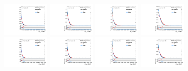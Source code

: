 \begin{figure}[htbp]
  \centering
  \includegraphics[width=0.21\textwidth]{fig/uncertainties/systs_res_e_HP_bb_LDy_MVVScale_ProjX.pdf}
  \includegraphics[width=0.21\textwidth]{fig/uncertainties/systs_res_e_LP_bb_LDy_MVVScale_ProjX.pdf}
  \includegraphics[width=0.21\textwidth]{fig/uncertainties/systs_res_e_HP_bb_HDy_MVVScale_ProjX.pdf}
  \includegraphics[width=0.21\textwidth]{fig/uncertainties/systs_res_e_LP_bb_HDy_MVVScale_ProjX.pdf}\\
  \includegraphics[width=0.21\textwidth]{fig/uncertainties/systs_res_e_HP_nobb_LDy_MVVScale_ProjX.pdf}
  \includegraphics[width=0.21\textwidth]{fig/uncertainties/systs_res_e_LP_nobb_LDy_MVVScale_ProjX.pdf}
  \includegraphics[width=0.21\textwidth]{fig/uncertainties/systs_res_e_HP_nobb_HDy_MVVScale_ProjX.pdf}
  \includegraphics[width=0.21\textwidth]{fig/uncertainties/systs_res_e_LP_nobb_HDy_MVVScale_ProjX.pdf}\\

\end{figure}

